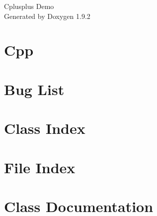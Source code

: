 \documentclass[twoside]{book}
\newcommand{\+}{\discretionary{\mbox{\scriptsize$\hookleftarrow$}}{}{}}
\newcommand{\clearemptydoublepage}{%
    \newpage{\pagestyle{empty}\cleardoublepage}%
  }
\begin{document}
  \raggedbottom
    \hypersetup{pageanchor=false,
                bookmarksnumbered=true,
                pdfencoding=unicode
               }
  \begin{titlepage}
  \vspace*{7cm}
  \begin{center}%
  {\Large Cplusplus Demo}\\
  \vspace*{1cm}
  {\large Generated by Doxygen 1.9.2}\\
  \end{center}
  \end{titlepage}
  \clearemptydoublepage
  \tableofcontents
  \clearemptydoublepage
  \hypersetup{pageanchor=true}
\chapter{Cpp}
\label{md__r_e_a_d_m_e}

\chapter{Bug List}
\label{bug}

\chapter{Class Index}

\chapter{File Index}

\chapter{Class Documentation}






\end{document}
